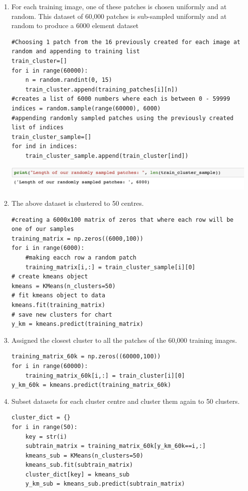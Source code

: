 \documentclass{article}      %
\begin{document}
\begin{enumerate}[label=(\alph*)]
\item For each training image,  one of these patches is chosen uniformly and at random. This dataset of 60,000 patches is sub-sampled uniformly and at random to produce a 6000 element dataset

\begin{lstlisting}
#Choosing 1 patch from the 16 previously created for each image at random and appending to training list
train_cluster=[]
for i in range(60000):
    n = random.randint(0, 15)
    train_cluster.append(training_patches[i][n])
#creates a list of 6000 numbers where each is between 0 - 59999
indices = random.sample(range(60000), 6000)
#appending randomly sampled patches using the previously created list of indices
train_cluster_sample=[]
for ind in indices:
    train_cluster_sample.append(train_cluster[ind])
\end{lstlisting}

\includegraphics[width=\textwidth]{lengthpatch}

\item The above dataset is clustered to 50 centres. 

\begin{lstlisting}
#creating a 6000x100 matrix of zeros that where each row will be one of our samples
training_matrix = np.zeros((6000,100))
for i in range(6000):
    #making eacch row a random patch
    training_matrix[i,:] = train_cluster_sample[i][0]
# create kmeans object
kmeans = KMeans(n_clusters=50)
# fit kmeans object to data
kmeans.fit(training_matrix)
# save new clusters for chart
y_km = kmeans.predict(training_matrix)
\end{lstlisting}

\item Assigned the closest cluster to all the patches of the 60,000 training images.

\begin{lstlisting}
training_matrix_60k = np.zeros((60000,100))
for i in range(60000):
    training_matrix_60k[i,:] = train_cluster[i][0]
y_km_60k = kmeans.predict(training_matrix_60k)
\end{lstlisting}

\item Subset datasets for each cluster centre and cluster them again to 50 clusters.

\begin{lstlisting}
cluster_dict = {}
for i in range(50):
    key = str(i)
    subtrain_matrix = training_matrix_60k[y_km_60k==i,:]
    kmeans_sub = KMeans(n_clusters=50)
    kmeans_sub.fit(subtrain_matrix)
    cluster_dict[key] = kmeans_sub 
    y_km_sub = kmeans_sub.predict(subtrain_matrix)
\end{lstlisting}

\end{enumerate}
\end{document}
